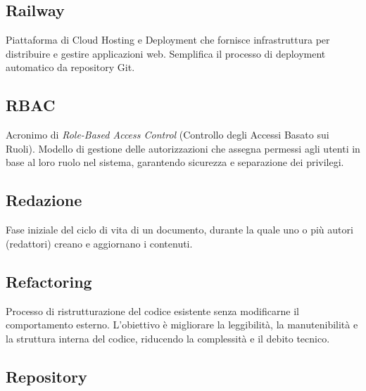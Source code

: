 \documentclass[a4paper, 11pt, oneside]{scrartcl} %
\begin{document}
\subsection*{Railway}


Piattaforma di Cloud Hosting e Deployment che fornisce infrastruttura per distribuire e gestire applicazioni web. Semplifica il processo di deployment automatico da repository Git.

\vspace{0.5cm}

\subsection*{RBAC}


Acronimo di \textit{Role-Based Access Control} (Controllo degli Accessi Basato sui Ruoli). Modello di gestione delle autorizzazioni che assegna permessi agli utenti in base al loro ruolo nel sistema, garantendo sicurezza e separazione dei privilegi.

\vspace{0.5cm}

\subsection*{Redazione}


Fase iniziale del ciclo di vita di un documento, durante la quale uno o più autori (redattori) creano e aggiornano i contenuti.

\vspace{0.5cm}

\subsection*{Refactoring}
Processo di ristrutturazione del codice esistente senza modificarne il comportamento esterno. L'obiettivo è migliorare la leggibilità, la manutenibilità e la struttura interna del codice, riducendo la complessità e il debito tecnico.
\vspace{0.5cm}

\subsection*{Repository}
\end{document}
